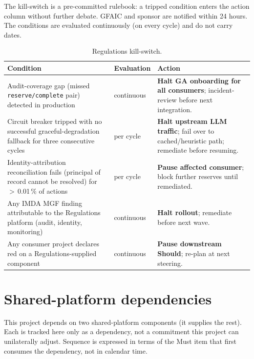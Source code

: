 \documentclass[11pt,a4paper,twoside]{report}
\begin{document}
The kill-switch is a pre-committed rulebook: a tripped condition enters
the action column without further debate. GFAIC and sponsor are
notified within 24 hours. The conditions are evaluated continuously
(on every cycle) and do not carry dates.

\begin{table}[htbp]
\centering
\caption{Regulations kill-switch.}
\label{tab:reg-kill-switch}
\footnotesize
\begin{tabularx}{\linewidth}{@{}l l X@{}}
\toprule
\textbf{Condition} & \textbf{Evaluation} & \textbf{Action} \\ \midrule
Audit-coverage gap (missed \texttt{reserve/complete} pair) detected in production & continuous & \textbf{Halt GA onboarding for all consumers}; incident-review before next integration. \\
Circuit breaker tripped with no successful graceful-degradation fallback for three consecutive cycles & per cycle & \textbf{Halt upstream LLM traffic}; fail over to cached/heuristic path; remediate before resuming. \\
Identity-attribution reconciliation fails (principal of record cannot be resolved) for $>$\,0.01\,\% of actions & per cycle & \textbf{Pause affected consumer}; block further reserves until remediated. \\
Any IMDA MGF finding attributable to the Regulations platform (audit, identity, monitoring) & continuous & \textbf{Halt rollout}; remediate before next wave. \\
Any consumer project declares red on a Regulations-supplied component & continuous & \textbf{Pause downstream Should}; re-plan at next steering. \\
\bottomrule
\end{tabularx}
\end{table}

\section{Shared-platform dependencies}\label{sec:reg-shared-deps}

This project depends on two shared-platform components (it supplies
the rest). Each is tracked here only as a dependency, not a commitment
this project can unilaterally adjust. Sequence is expressed in terms
of the Must item that first consumes the dependency, not in calendar
time.
\end{document}
